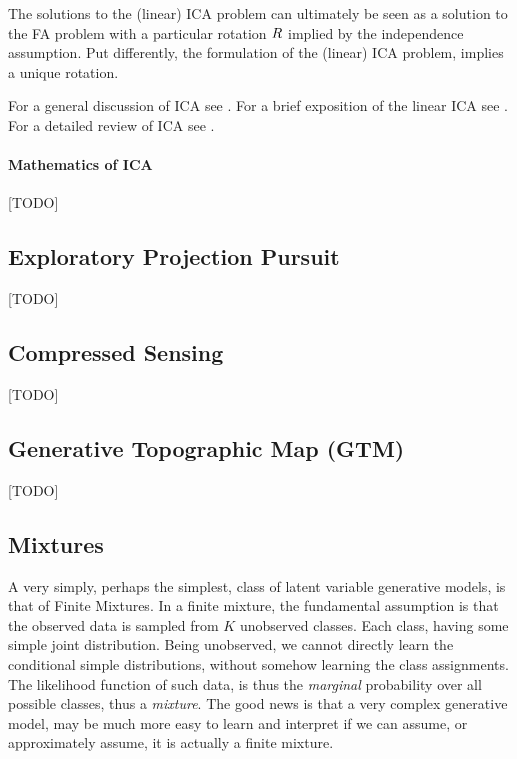 \begin{remark}
The solutions to the (linear) ICA problem can ultimately be seen as a solution to the FA problem with a particular rotation $R$ implied by the independence assumption.
Put differently, the formulation of the (linear) ICA problem, implies a unique rotation. 
\end{remark}

For a general discussion of ICA see \cite{jolliffe_principal_2002}.
For a brief exposition of the linear ICA see \cite{hastie_elements_2003}. 
For a detailed review of ICA see \cite{hyvarinen_independent_2000}. 



\paragraph{Mathematics of ICA}
[TODO]








\subsection{Exploratory Projection Pursuit}
\label{sec:exploratpory_ppr}
[TODO]




\subsection{Compressed Sensing}
\label{sec:compressed_sensing}
[TODO]





\subsection{Generative Topographic Map (GTM)}
\label{sec:gtm}
[TODO]



\subsection{Mixtures}
A very simply, perhaps the simplest, class of latent variable generative models, is that of Finite Mixtures. 
In a finite mixture, the fundamental assumption is that the observed data is sampled from $K$ unobserved classes. Each class, having some simple joint distribution. 
Being unobserved, we cannot directly learn the conditional simple distributions, without somehow learning the class assignments. 
The likelihood function of such data, is thus the \emph{marginal} probability over all possible classes, thus a \emph{mixture}.
The good news is that a very complex generative model, may be much more easy to learn and interpret if we can assume, or approximately assume, it is actually a finite mixture.

